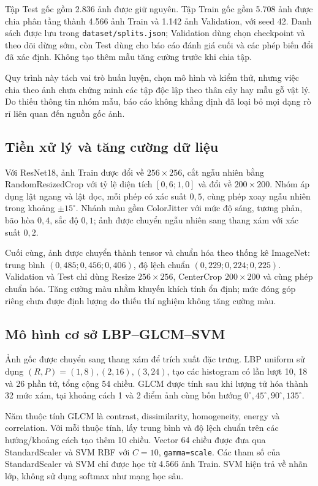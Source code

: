 \documentclass[conference]{IEEEtran}
\begin{document}
Tập Test gốc gồm 2.836 ảnh được giữ nguyên. Tập Train gốc gồm 5.708 ảnh được chia phân tầng thành 4.566 ảnh Train và 1.142 ảnh Validation, với seed 42. Danh sách được lưu trong \texttt{dataset/splits.json}; Validation dùng chọn checkpoint và theo dõi dừng sớm, còn Test dùng cho báo cáo đánh giá cuối và các phép biến đổi đã xác định. Không tạo thêm mẫu tăng cường trước khi chia tập.

Quy trình này tách vai trò huấn luyện, chọn mô hình và kiểm thử, nhưng việc chia theo ảnh chưa chứng minh các tập độc lập theo thân cây hay mẫu gỗ vật lý. Do thiếu thông tin nhóm mẫu, báo cáo không khẳng định đã loại bỏ mọi dạng rò rỉ liên quan đến nguồn gốc ảnh.

\subsection{Tiền xử lý và tăng cường dữ liệu}
Với ResNet18, ảnh Train được đổi về $256\times256$, cắt ngẫu nhiên bằng RandomResizedCrop với tỷ lệ diện tích $[0{,}6;1{,}0]$ và đổi về $200\times200$. Nhóm áp dụng lật ngang và lật dọc, mỗi phép có xác suất $0{,}5$, cùng phép xoay ngẫu nhiên trong khoảng $\pm15^\circ$. Nhánh màu gồm ColorJitter với mức độ sáng, tương phản, bão hòa $0{,}4$, sắc độ $0{,}1$; ảnh được chuyển ngẫu nhiên sang thang xám với xác suất $0{,}2$.

Cuối cùng, ảnh được chuyển thành tensor và chuẩn hóa theo thống kê ImageNet: trung bình $(0{,}485;0{,}456;0{,}406)$, độ lệch chuẩn $(0{,}229;0{,}224;0{,}225)$. Validation và Test chỉ dùng Resize $256\times256$, CenterCrop $200\times200$ và cùng phép chuẩn hóa. Tăng cường màu nhằm khuyến khích tính ổn định; mức đóng góp riêng chưa được định lượng do thiếu thí nghiệm không tăng cường màu.

\subsection{Mô hình cơ sở LBP--GLCM--SVM}
Ảnh gốc được chuyển sang thang xám để trích xuất đặc trưng. LBP uniform sử dụng $(R,P)=(1,8),(2,16),(3,24)$, tạo các histogram có lần lượt 10, 18 và 26 phần tử, tổng cộng 54 chiều. GLCM được tính sau khi lượng tử hóa thành 32 mức xám, tại khoảng cách 1 và 2 điểm ảnh cùng bốn hướng $0^\circ,45^\circ,90^\circ,135^\circ$.

Năm thuộc tính GLCM là contrast, dissimilarity, homogeneity, energy và correlation. Với mỗi thuộc tính, lấy trung bình và độ lệch chuẩn trên các hướng/khoảng cách tạo thêm 10 chiều. Vector 64 chiều được đưa qua StandardScaler và SVM RBF với $C=10$, \texttt{gamma=scale}. Các tham số của StandardScaler và SVM chỉ được học từ 4.566 ảnh Train. SVM hiện trả về nhãn lớp, không sử dụng softmax như mạng học sâu.
\end{document}
